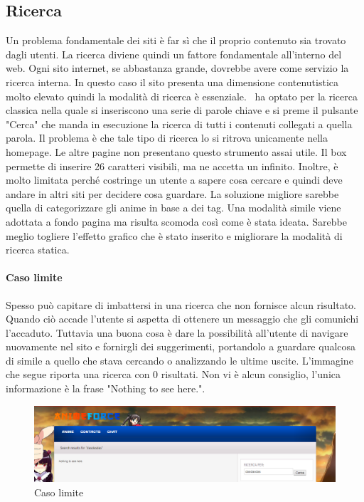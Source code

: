 \subsection{Ricerca} \label{Ricerca}
Un problema fondamentale dei siti è far sì che il proprio contenuto sia trovato dagli utenti. La ricerca diviene quindi un fattore fondamentale all'interno del web. Ogni sito internet, se abbastanza grande, dovrebbe avere come servizio la ricerca interna. In questo caso il sito presenta una dimensione  contenutistica molto elevato quindi la modalità di ricerca è essenziale.
\nomeSito\ ha optato per la ricerca classica nella quale si inseriscono una serie di parole chiave e si preme il pulsante "Cerca" che manda in esecuzione la ricerca di tutti i contenuti collegati a quella parola.
Il problema è che tale tipo di ricerca lo si ritrova unicamente nella homepage. Le altre pagine non presentano questo strumento assai utile. Il box permette di inserire 26 caratteri visibili, ma ne accetta un infinito. Inoltre, è molto limitata perché costringe un utente a sapere cosa cercare e quindi deve andare in altri siti per decidere cosa guardare. La soluzione migliore sarebbe quella di categorizzare gli anime in base a dei tag. Una modalità simile viene adottata a fondo pagina ma risulta scomoda così come è stata ideata. Sarebbe meglio togliere l'effetto grafico che è stato inserito e migliorare la modalità di ricerca statica.

\paragraph{Caso limite}
Spesso può capitare di imbattersi in una ricerca che non fornisce alcun risultato. Quando ciò accade l'utente si aspetta di ottenere un messaggio che gli comunichi l'accaduto. Tuttavia una buona cosa è dare la possibilità all'utente di navigare nuovamente nel sito e fornirgli dei suggerimenti, portandolo a guardare qualcosa di simile a quello che stava cercando o analizzando le ultime uscite. L'immagine che segue riporta una ricerca con 0 risultati. Non vi è alcun consiglio, l'unica informazione è  la frase "Nothing to see here.". 

\begin{figure}[H]
	\centering
	\includegraphics[width=1\textwidth]{img/CasoLimite.png}
	\caption{Caso limite} 
	\label{img5} 
\end{figure}
